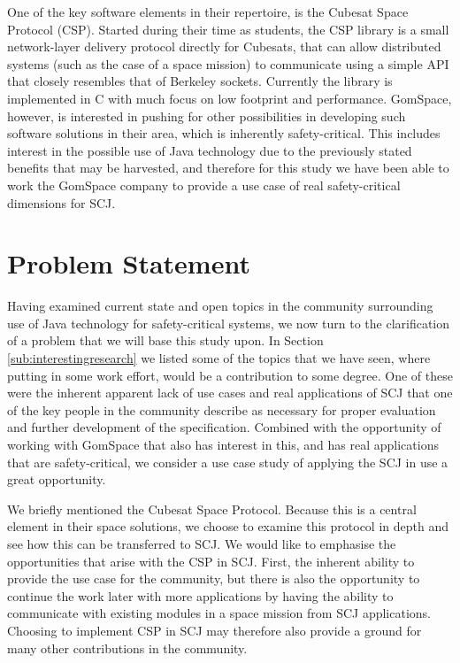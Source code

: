 One of the key software elements in their repertoire, is the Cubesat Space Protocol (CSP). Started during their time as students, the CSP library is a small network-layer delivery protocol directly for Cubesats, that can allow distributed systems (such as the case of a space mission) to communicate using a simple API that closely resembles that of Berkeley sockets. Currently the library is implemented in C with much focus on low footprint and performance. GomSpace, however, is interested in pushing for other possibilities in developing such software solutions in their area, which is inherently safety-critical. This includes interest in the possible use of Java technology due to the previously stated benefits that may be harvested, and therefore for this study we have been able to work the GomSpace company to provide a use case of real safety-critical dimensions for SCJ.


\section{Problem Statement} %
\label{sec:problem_statement}
Having examined current state and open topics in the community surrounding use of Java technology for safety-critical systems, we now turn to the clarification of a problem that we will base this study upon. In Section \ref{sub:interestingresearch} we listed some of the topics that we have seen, where putting in some work effort, would be a contribution to some degree. One of these were the inherent apparent lack of use cases and real applications of SCJ that one of the key people in the community describe as necessary for proper evaluation and further development of the specification. Combined with the opportunity of working with GomSpace that also has interest in this, and has real applications that are safety-critical, we consider a use case study of applying the SCJ in use a great opportunity.

We briefly mentioned the Cubesat Space Protocol. Because this is a central element in their space solutions, we choose to examine this protocol in depth and see how this can be transferred to SCJ. We would like to emphasise the opportunities that arise with the CSP in SCJ. First, the inherent ability to provide the use case for the community, but there is also the opportunity to continue the work later with more applications by having the ability to communicate with existing modules in a space mission from SCJ applications. Choosing to implement CSP in SCJ may therefore also provide a ground for many other contributions in the community.

